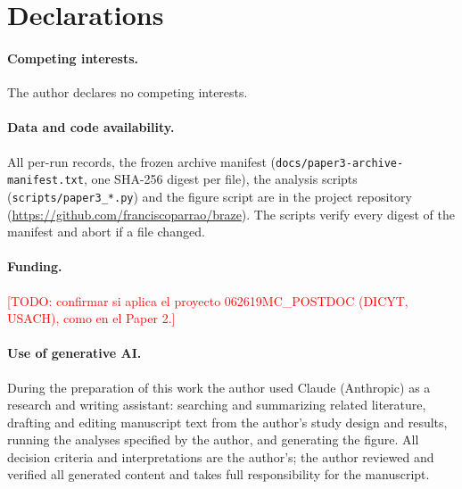 \documentclass[11pt]{article}
\begin{document}
\section*{Declarations}
\sloppy

\paragraph{Competing interests.} The author declares no competing interests.

\paragraph{Data and code availability.} All per-run records, the frozen archive
manifest (\texttt{docs/\allowbreak paper3-archive-\allowbreak manifest.txt}, one SHA-256 digest per
file), the analysis scripts (\texttt{scripts/paper3\_*.py}) and the figure
script are in the project repository
(\url{https://github.com/franciscoparrao/braze}). The scripts verify every digest
of the manifest and abort if a file changed.

\paragraph{Funding.} \textcolor{red}{[TODO: confirmar si aplica el proyecto
062619MC\_POSTDOC (DICYT, USACH), como en el Paper 2.]}

\paragraph{Use of generative AI.} During the preparation of this work the author
used Claude (Anthropic) as a research and writing assistant: searching and
summarizing related literature, drafting and editing manuscript text from the
author's study design and results, running the analyses specified by the author,
and generating the figure. All decision criteria and interpretations are the
author's; the author reviewed and verified all generated content and takes full
responsibility for the manuscript.



\end{document}
